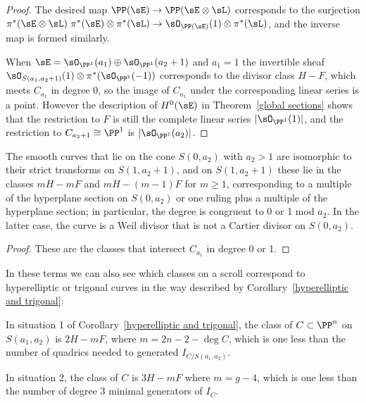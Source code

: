\begin{proof} 
The desired map $\PP(\sE) \to \PP(\sE\otimes \sL)$ corresponds to the surjection 
$\pi^*(\sE \otimes\sL) \ \pi^*(\sE) \otimes \pi^*(\sL) \to \sO_{\PP(\sE)}(1) \otimes \pi^*(\sL)$, 
and the inverse map is formed similarly.

When $\sE = \sO_{\PP^1}(a_1)\oplus \sO_{\PP^1}(a_2+1)$ and $a_1 = 1$ the
invertible sheaf
$\sO_{S(a_1, a_{2}+1)}(1) \otimes \pi^{*}(\sO_{\PP^{1}}(-1))$ corresponds to the divisor class $H-F$, which meets $C_{a_1}$  in degree 0, so the image
of $C_{a_1}$ under the corresponding linear series is a point. However the description of  $H^0(\sE)$ in
Theorem~\ref{global sections} shows that the restriction to $F$
is still the complete linear series $|\sO_{\PP^1}(1)|$, and the restriction to $C_{{a_2}+1}\cong \PP^1$
is $|\sO_{\PP^1}(a_2)|$.
\end{proof}

\begin{corollary}\label{curves on a singular scroll}
 The smooth curves that lie on the cone $S(0,a_2)$ with $a_2>1$ are isomorphic to their strict transforms
 on $S(1,a_2+1)$, and on $S(1,a_2+1)$ these lie in the classes $mH-mF$ and $mH-(m-1)F$ for $m\geq 1$, 
 corresponding to a multiple of the hyperplane section on $S(0,a_2)$ or one ruling plus a multiple of the hyperplane section;
 in particular, the degree is congruent to 0 or 1 mod $a_2$. 
 In the latter case, the curve is a Weil divisor that is not a Cartier divisor on $S(0,a_2)$.
\end{corollary}

\begin{proof}
These are the classes that intersect $C_{a_1}$ in degree 0 or 1.
\end{proof}


In these terms we can also see which classes on a scroll correspond to hyperelliptic or trigonal curves in the way described by Corollary~\ref{hyperelliptic and trigonal}:

\begin{corollary}\label{which class}
In situation 1 of Corollary~\ref{hyperelliptic and trigonal}, the class of $C\subset \PP^n$ on $S(a_1,a_2)$ is
$2H - mF$, where $m =  2n-2 - \deg C$, which is one less than the number of quadrics needed to generated $I_{C/S(a_1,a_2)}$.

In situation 2, the class of $C$ is 
$3H -  mF$ where $m = g-4$, which is one less than the number of degree 3 minimal generators of $I_{C}.$
\end{corollary}

